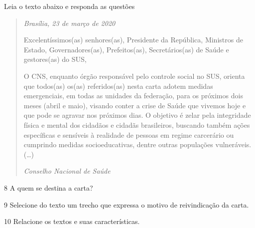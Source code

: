 Leia o texto abaixo e responda as questões

\begin{quote}

\emph{Brasília, 23 de março de 2020}

Excelentíssimos(as) senhores(as), Presidente da República, Ministros de
Estado, Governadores(as), Prefeitos(as), Secretários(as) de Saúde e
gestores(as) do SUS,

O CNS, enquanto órgão responsável pelo controle social no SUS, orienta
que todos(as) os(as) referidos(as) nesta carta adotem medidas
emergenciais, em todas as unidades da federação, para os próximos dois
meses (abril e maio), visando conter a crise de Saúde que vivemos hoje e
que pode se agravar nos próximos dias. O objetivo é zelar pela
integridade física e mental dos cidadãos e cidadãs brasileiros, buscando
também ações específicas e sensíveis à realidade de pessoas em regime
carcerário ou cumprindo medidas socioeducativas, dentre outras
populações vulneráveis. (\ldots{})

\emph{Conselho Nacional de Saúde} 

\end{quote} 


\num{8} A quem se destina a carta?


\num{9} Selecione do texto um trecho que expressa o motivo de reivindicação da carta.


\num{10} Relacione os textos e suas características.

